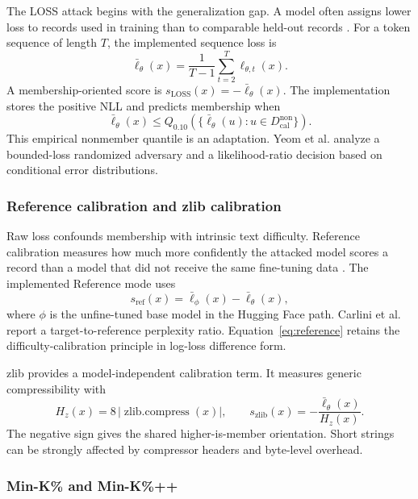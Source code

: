 \documentclass[11pt]{article}
\begin{document}
The LOSS attack begins with the generalization gap. A model often assigns lower loss to records used in training than to comparable held-out records \citep{yeom2018privacy}. For a token sequence of length $T$, the implemented sequence loss is
\begin{equation}
    \bar\ell_\theta(x)=\frac{1}{T-1}\sum_{t=2}^{T}\ell_{\theta,t}(x).
\end{equation}
A membership-oriented score is $s_{\mathrm{LOSS}}(x)=-\bar\ell_\theta(x)$. The implementation stores the positive NLL and predicts membership when
\begin{equation}
    \bar\ell_\theta(x)\leq Q_{0.10}
    \left(\{\bar\ell_\theta(u):u\in D_{\mathrm{cal}}^{\mathrm{non}}\}\right).
    \label{eq:loss}
\end{equation}
This empirical nonmember quantile is an adaptation. Yeom et al. analyze a bounded-loss randomized adversary and a likelihood-ratio decision based on conditional error distributions.

\subsubsection{Reference calibration and zlib calibration}

Raw loss confounds membership with intrinsic text difficulty. Reference calibration measures how much more confidently the attacked model scores a record than a model that did not receive the same fine-tuning data \citep{carlini2021extracting}. The implemented Reference mode uses
\begin{equation}
    s_{\mathrm{ref}}(x)=\bar\ell_\phi(x)-\bar\ell_\theta(x),
    \label{eq:reference}
\end{equation}
where $\phi$ is the unfine-tuned base model in the Hugging Face path. Carlini et al. report a target-to-reference perplexity ratio. Equation~\ref{eq:reference} retains the difficulty-calibration principle in log-loss difference form.

zlib provides a model-independent calibration term. It measures generic compressibility with
\begin{equation}
    H_z(x)=8\,|\operatorname{zlib.compress}(x)|,
    \qquad
    s_{\mathrm{zlib}}(x)=-\frac{\bar\ell_\theta(x)}{H_z(x)}.
    \label{eq:zlib}
\end{equation}
The negative sign gives the shared higher-is-member orientation. Short strings can be strongly affected by compressor headers and byte-level overhead.

\subsubsection{Min-K\% and Min-K\%++}
\end{document}

